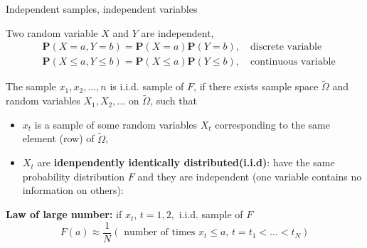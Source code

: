 \documentclass{beamer}
\begin{document}
\begin{frame}{Independent samples, independent variables}

    Two random variable $X$ and $Y$ are independent,
    \[ 
      \begin{split}
       & \mathbf{P}(X=a,Y=b)=\mathbf{P}(X=a)\mathbf{P}(Y=b), \quad 
       \mbox{discrete variable} \\
       & \mathbf{P}(X \le a,Y \le b)=\mathbf{P}(X \le a)\mathbf{P}(Y\le b), \quad 
       \mbox{continuous variable} 
      \end{split} 
    \]

   The sample $x_1,x_2,\ldots,n$ is i.i.d. sample of $F$, if
   there exists sample space $\widetilde{\Omega}$ and 
   random variables $X_1,X_2,\ldots $ on $\widetilde{\Omega}$, 
   such that 
        \begin{itemize}
        \item			
	   $x_t$ is a sample of some random variables $X_t$ 
	corresponding to the same element (row) of $\widetilde{\Omega}$,
        \item 			
		$X_t$ are \textbf{idenpendently identically distributed(i.i.d)}: have the same probability distribution $F$ and they are independent (one variable contains no information on others):

        \end{itemize}
 \medskip

	\textbf{Law of large number:} if $x_t$, $t=1,2,$ i.i.d. sample of $F$
     \[ F(a) \approx  \frac{1}{N} (\mbox{ number of times $x_t \le a$, $t=t_1 < \ldots < t_N$}) \]
	

\end{frame}
\end{document}
